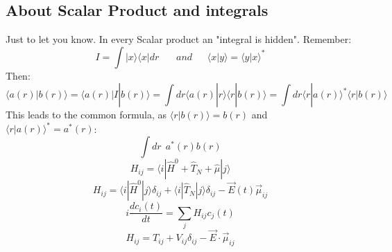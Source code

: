 

\subsection{About Scalar Product and integrals}
Just to let you know. In every Scalar product an "integral is hidden". Remember:
\begin{equation}
I = \int | x \rangle \langle x | dr \ \ \ \ \ \ \ \ and \ \ \ \ \ \ \ \langle x | y \rangle = \langle y | x \rangle^*
\end{equation}
Then:
\begin{equation}
\langle a(r) | b(r) \rangle = \langle a(r) | I | b(r) \rangle = \int dr \langle a(r) | r \rangle \langle r | b(r) \rangle = \int dr \langle r | a(r) \rangle^* \langle r | b(r) \rangle
\end{equation}
This leads to the common formula, as $\langle r | b(r) \rangle=b(r)$ and $\langle r | a(r) \rangle^*=a^*(r)$:
\begin{equation}
\int dr \ \ a^*(r) b(r)
\end{equation}
\vspace{10cm}
\begin{equation}
H_{ij} = \langle i|\hat{H}^0 + \hat{T}_N + \hat{\mu}|j\rangle
\end{equation}
\begin{equation}
H_{ij} = \langle i|\hat{H}^0|j\rangle \delta_{ij} + \langle i| \hat{T}_N |j\rangle \delta_{ij} - \vec{E}(t) \vec{\mu}_{ij}
\end{equation}
\begin{equation}
i\dfrac{dc_i(t)}{dt}=\sum_j H_{ij}c_j(t)
\end{equation}
\begin{equation}
H_{ij}=T_{ij}+V_{ij}\delta_{ij} - \vec{E} \cdot \vec{\mu}_{ij}
\end{equation}